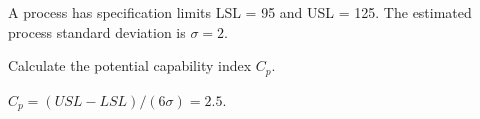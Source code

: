 
\begin{question}
A process has specification limits LSL = 95 and USL = 125. The estimated process standard deviation is \(\sigma=2\).

Calculate the potential capability index \(C_p\).
\end{question}

\begin{solution}
\(C_p=(USL-LSL)/(6\sigma)=2.5\).
\end{solution}

